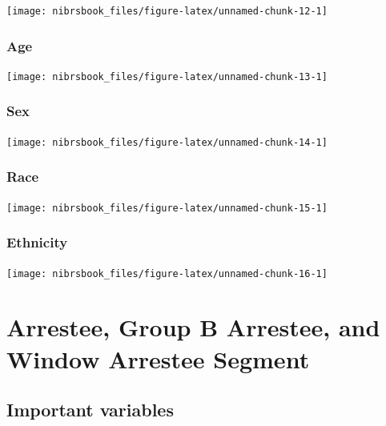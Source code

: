 \documentclass[
  12pt,
  openany]{book}
\begin{document}
\begin{center}\texttt{[image: nibrsbook\_files/figure-latex/unnamed-chunk-12-1]} \end{center}

\hypertarget{age-1}{%
\subsection{Age}\label{age-1}}

\begin{center}\texttt{[image: nibrsbook\_files/figure-latex/unnamed-chunk-13-1]} \end{center}

\hypertarget{sex-1}{%
\subsection{Sex}\label{sex-1}}

\begin{center}\texttt{[image: nibrsbook\_files/figure-latex/unnamed-chunk-14-1]} \end{center}

\hypertarget{race-1}{%
\subsection{Race}\label{race-1}}

\begin{center}\texttt{[image: nibrsbook\_files/figure-latex/unnamed-chunk-15-1]} \end{center}

\hypertarget{ethnicity}{%
\subsection{Ethnicity}\label{ethnicity}}

\begin{center}\texttt{[image: nibrsbook\_files/figure-latex/unnamed-chunk-16-1]} \end{center}

\hypertarget{arrestee-group-b-arrestee-and-window-arrestee-segment}{%
\chapter{Arrestee, Group B Arrestee, and Window Arrestee Segment}\label{arrestee-group-b-arrestee-and-window-arrestee-segment}}

\hypertarget{important-variables-4}{%
\section{Important variables}\label{important-variables-4}}
\end{document}
